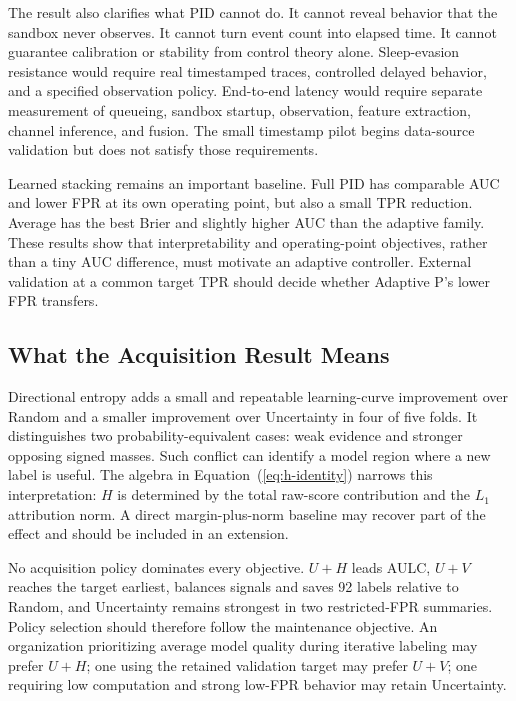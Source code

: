 The result also clarifies what PID cannot do. It cannot reveal behavior that the
sandbox never observes. It cannot turn event count into elapsed time. It cannot
guarantee calibration or stability from control theory alone. Sleep-evasion
resistance would require real timestamped traces, controlled delayed behavior,
and a specified observation policy. End-to-end latency would require separate
measurement of queueing, sandbox startup, observation, feature extraction,
channel inference, and fusion. The small timestamp pilot begins data-source
validation but does not satisfy those requirements.

Learned stacking remains an important baseline. Full PID has comparable AUC and
lower FPR at its own operating point, but also a small TPR reduction. Average has
the best Brier and slightly higher AUC than the adaptive family. These results
show that interpretability and operating-point objectives, rather than a tiny
AUC difference, must motivate an adaptive controller. External validation at a
common target TPR should decide whether Adaptive P's lower FPR transfers.

\subsection{What the Acquisition Result Means}

Directional entropy adds a small and repeatable learning-curve improvement over
Random and a smaller improvement over Uncertainty in four of five folds. It
distinguishes two probability-equivalent cases: weak evidence and stronger
opposing signed masses. Such conflict can identify a model region where a new
label is useful. The algebra in Equation~(\ref{eq:h-identity}) narrows this
interpretation: $H$ is determined by the total raw-score contribution and the
$L_1$ attribution norm. A direct margin-plus-norm baseline may recover part of
the effect and should be included in an extension.

No acquisition policy dominates every objective. $U+H$ leads AULC, $U+V$
reaches the target earliest, \xfull balances signals and saves 92 labels
relative to Random, and Uncertainty remains strongest in two restricted-FPR
summaries. Policy selection should therefore follow the maintenance objective.
An organization prioritizing average model quality during iterative labeling may
prefer $U+H$; one using the retained validation target may prefer $U+V$; one
requiring low computation and strong low-FPR behavior may retain Uncertainty.

